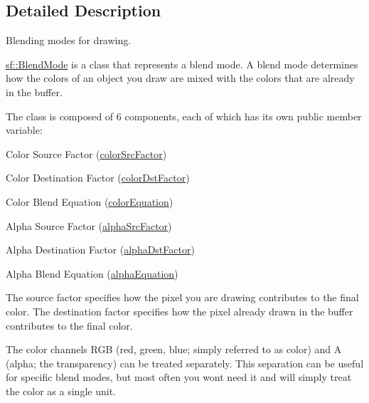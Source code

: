 \subsection{Detailed Description}
Blending modes for drawing. 

\hyperlink{structsf_1_1_blend_mode}{sf\+::\+Blend\+Mode} is a class that represents a blend mode. A blend mode determines how the colors of an object you draw are mixed with the colors that are already in the buffer.

The class is composed of 6 components, each of which has its own public member variable\+: \begin{DoxyItemize}
\item Color Source Factor (\hyperlink{structsf_1_1_blend_mode_a32d1a55dbfada86a06d9b881dc8ccf7b}{color\+Src\+Factor}) \item Color Destination Factor (\hyperlink{structsf_1_1_blend_mode_adee68ee59e7f1bf71d12db03d251104d}{color\+Dst\+Factor}) \item Color Blend Equation (\hyperlink{structsf_1_1_blend_mode_aed12f06eb7f50a1b95b892b0964857b1}{color\+Equation}) \item Alpha Source Factor (\hyperlink{structsf_1_1_blend_mode_aa94e44f8e1042a7357e8eff78c61a1be}{alpha\+Src\+Factor}) \item Alpha Destination Factor (\hyperlink{structsf_1_1_blend_mode_aaf85b6b7943181cc81745569c4851e4e}{alpha\+Dst\+Factor}) \item Alpha Blend Equation (\hyperlink{structsf_1_1_blend_mode_a68f5a305e0912946f39ba6c9265710c4}{alpha\+Equation})\end{DoxyItemize}
The source factor specifies how the pixel you are drawing contributes to the final color. The destination factor specifies how the pixel already drawn in the buffer contributes to the final color.

The color channels R\+GB (red, green, blue; simply referred to as color) and A (alpha; the transparency) can be treated separately. This separation can be useful for specific blend modes, but most often you won\textquotesingle{}t need it and will simply treat the color as a single unit.

